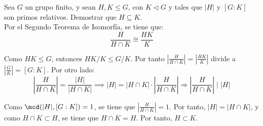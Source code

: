 \begin{ejercicio}
    Sea $G$ un grupo finito, y sean $H,K\leq G$, con $K\lhd G$ y tales que $|H|$ y $[G:K]$ son primos relativos. Demostrar que $H\subseteq K$.\\
    
    Por el Segundo Teorema de Isomorfía, se tiene que:
    \begin{equation*}
        \dfrac{H}{H\cap K} \cong \dfrac{HK}{K}
    \end{equation*}

    Como $HK\leq G$, entonces $HK/K \leq G/K$. Por tanto $\left|\frac{H}{H\cap K}\right| = \left|\frac{HK}{K}\right|$ divide a $\left|\frac{G}{K}\right| = [G:K]$. Por otro lado:
    \begin{equation*}
        \left|\frac{H}{H\cap K}\right| = \dfrac{|H|}{|H\cap K|} \implies |H| = |H\cap K|\cdot \left|\frac{H}{H\cap K}\right|\Longrightarrow \left|\frac{H}{H\cap K}\right| \mid |H|
    \end{equation*}

    Como $\mcd(|H|,[G:K])=1$, se tiene que $\left|\frac{H}{H\cap K}\right|=1$. Por tanto, $|H|=|H\cap K|$, y como $H\cap K\subset H$, se tiene que $H\cap K=H$. Por tanto, $H\subset K$.
\end{ejercicio}

